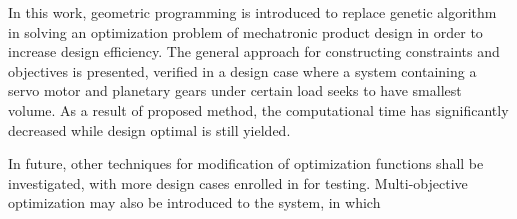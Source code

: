 In this work, geometric programming is introduced to replace genetic algorithm in solving an optimization problem of mechatronic product design in order to increase design efficiency. The general approach for constructing constraints and objectives is presented, verified in a design case where a system containing a servo motor and planetary gears under certain load seeks to have smallest volume. As a result of proposed method, the computational time has significantly decreased while design optimal is still yielded.

In future, other techniques for modification of optimization functions shall be investigated, with more design cases enrolled in for testing. Multi-objective optimization may also be introduced to the system, in which 